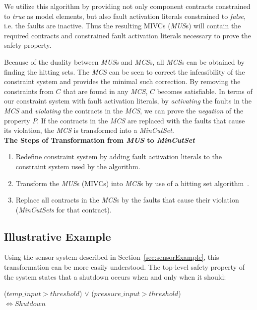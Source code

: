 We utilize this algorithm by providing not only component contracts constrained to \textit{true} as model elements, but also fault activation literals constrained to \textit{false}, i.e. the faults are inactive. Thus the resulting MIVCs (\textit{MUS}s) will contain the required contracts and constrained fault activation literals necessary to prove the safety property. 

Because of the duality between \textit{MUS}s and \textit{MCS}s, all \textit{MCS}s can be obtained by finding the hitting sets. The \textit{MCS} can be seen to correct the infeasibility of the constraint system and provides the minimal such correction. By removing the constraints from $C$ that are found in any \textit{MCS}, $C$ becomes satisfiable. In terms of our constraint system with fault activation literals, by \textit{activating} the faults in the \textit{MCS} and \textit{violating} the contracts in the \textit{MCS}, we can prove the \textit{negation} of the property $P$. If the contracts in the \textit{MCS} are replaced with the faults that cause its violation, the \textit{MCS} is transformed into a \textit{MinCutSet}.\\

\textbf{The Steps of Transformation from \textit{MUS} to \textit{MinCutSet}}
\begin{enumerate}
\item Redefine constraint system by adding fault activation literals to the constraint system used by the \aivcalg algorithm. %
\item Transform the \textit{MUS}s (MIVCs) into \textit{MCS}s by use of a hitting set algorithm~\cite{murakami2013efficient,gainer2017minimal}. 
\item Replace all contracts in the \textit{MCS}s by the faults that cause their violation (\textit{MinCutSets} for that contract). 
\end{enumerate}

\subsection{Illustrative Example}
Using the sensor system described in Section~\ref{sec:sensorExample}, this transformation can be more easily understood. The top-level safety property of the system states that a shutdown occurs when and only when it should: 
\begin{center}
    ($temp\_input > threshold$) $\lor$ ($pressure\_input > threshold$)\\
    $\iff Shutdown$
    
\end{center}

